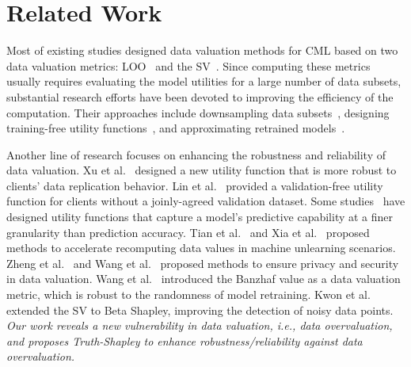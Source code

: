 \section{Related Work}

Most of existing studies designed data valuation methods for CML based on two data valuation metrics: LOO~\citep{cook1977detection} and the SV~\citep{shapley1953value}. 
Since computing these metrics usually requires evaluating the model utilities for a large number of data subsets, substantial research efforts have been devoted to improving the efficiency of the computation. 
Their approaches include downsampling data subsets~\cite{ghorbani2019data, jia2019towards, luo2024fast, luo2022shapley, lin2022measuring, jia2019efficient, kwon2021efficient}, designing training-free utility functions~\citep{wang2024helpful, pruthi2020estimating, koh2017understanding}, and approximating retrained models~\citep{wu2022davinz, just2023lava, nohyun2022data}.

Another line of research focuses on enhancing the robustness and reliability of data valuation. 
Xu et al.~ designed a new utility function that is more robust to clients’ data replication behavior. 
Lin et al.~ provided a validation-free utility function for clients without a joinly-agreed validation dataset. 
Some studies~\citep{schoch2022cs, xu2024model, xia2024p} have designed utility functions that capture a model’s predictive capability at a finer granularity than prediction accuracy. 
Tian et al.~ and Xia et al.~ proposed methods to accelerate recomputing data values in machine unlearning scenarios. 
Zheng et al.~ and Wang et al.~ proposed methods to ensure privacy and security in data valuation.
Wang et al.~ introduced the Banzhaf value as a data valuation metric, which is robust to the randomness of model retraining. 
Kwon et al.~ extended the SV to Beta Shapley, improving the detection of noisy data points.
\textit{Our work reveals a new vulnerability in data valuation, i.e., data overvaluation, and proposes Truth-Shapley to enhance robustness/reliability against data overvaluation.}
